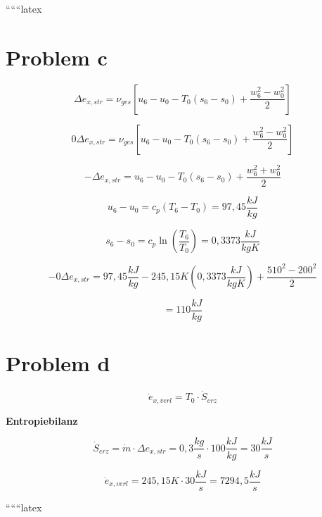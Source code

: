 ``````latex


\section*{Problem c}

\[
\Delta e_{x, str} = \nu_{ges} \left[ u_6 - u_0 - T_0 (s_6 - s_0) + \frac{w_6^2 - w_0^2}{2} \right]
\]

\[
0 \Delta e_{x, str} = \nu_{ges} \left[ u_6 - u_0 - T_0 (s_6 - s_0) + \frac{w_6^2 - w_0^2}{2} \right]
\]

\[
-\Delta e_{x, str} = u_6 - u_0 - T_0 (s_6 - s_0) + \frac{w_6^2 + w_0^2}{2}
\]

\[
u_6 - u_0 = c_p (T_6 - T_0) = 97,45 \frac{kJ}{kg}
\]

\[
s_6 - s_0 = c_p \ln \left( \frac{T_6}{T_0} \right) = 0,3373 \frac{kJ}{kgK}
\]

\[
-0 \Delta e_{x, str} = 97,45 \frac{kJ}{kg} - 245,15 K \left( 0,3373 \frac{kJ}{kgK} \right) + \frac{510^2 - 200^2}{2}
\]

\[
= 110 \frac{kJ}{kg}
\]

\section*{Problem d}

\[
\dot{e}_{x, verl} = T_0 \cdot \dot{S}_{erz}
\]

\textbf{Entropiebilanz}

\[
\dot{S}_{erz} = \dot{m} \cdot \Delta e_{x, str} = 0,3 \frac{kg}{s} \cdot 100 \frac{kJ}{kg} = 30 \frac{kJ}{s}
\]

\[
\dot{e}_{x, verl} = 245,15 K \cdot 30 \frac{kJ}{s} = 7294,5 \frac{kJ}{s}
\]

``````latex


